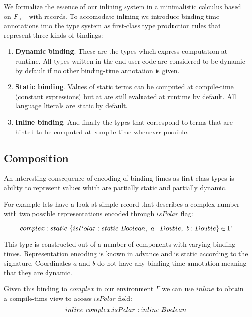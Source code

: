 We formalize the essence of our inlining system in a minimalistic calculus based
on $F_{<:}$ with records. To accomodate inlining we introduce binding-time annotations
into the type system as first-class type production rules that represent three kinds
of bindings:

\begin{enumerate}
  \item \textbf{Dynamic binding}. These are the types which express computation at runtime.
        All types written in the end user code are considered to be dynamic by default if
        no other binding-time annotation is given.

  \item \textbf{Static binding}. Values of static terms can be computed at compile-time
        (\eg constant expressions) but at are still evaluated at runtime by default.
        All language literals are static by default.

  \item \textbf{Inline binding}. And finally the types that correspond to terms that
        are hinted to be computed at compile-time whenever possible.
\end{enumerate}

\subsection{Composition}

An interesting consequence of encoding of binding times as first-class types is
ability to represent values which are partially static and partially dynamic.

For example lets have a look at simple record that describes a complex number with
two possible representations encoded through $isPolar$ flag:

\begin{equation}\nonumber
    complex: static\ \{ isPolar: static\ Boolean,\ a: Double,\ b: Double \} \in \Gamma
\end{equation}

This type is constructed out of a number of components with varying binding times.
Representation encoding is known in advance and is static according to the signature.
Coordinates $a$ and $b$ do not have any binding-time annotation meaning that they are
dynamic.

Given this binding to $complex$ in our environment $\Gamma$ we can use $inline$ to obtain
a compile-time view to access $isPolar$ field:
\begin{equation}\nonumber
  inline\ complex.isPolar: inline\ Boolean
\end{equation}

